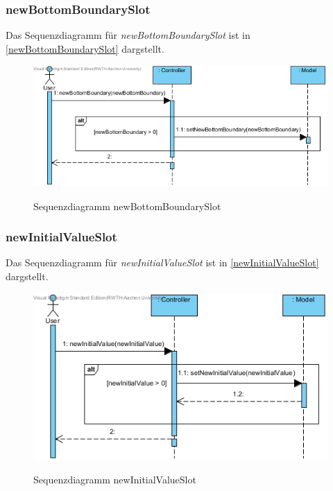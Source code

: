 \subsubsection*{newBottomBoundarySlot}

Das Sequenzdiagramm für \emph{newBottomBoundarySlot} ist in \ref{newBottomBoundarySlot} dargstellt.

\begin{figure}[H]
	\centering
	\includegraphics[scale=.6]{Bilder/Controller__newBottomBoundarySlot().jpg}\\
	\caption{Sequenzdiagramm newBottomBoundarySlot}
	\label{Sequenzdiagramm newBottomBoundarySlot}
\end{figure}

\subsubsection*{newInitialValueSlot}

Das Sequenzdiagramm für \emph{newInitialValueSlot} ist in \ref{newInitialValueSlot} dargstellt.

\begin{figure}[H]
	\centering
	\includegraphics[scale=.6]{Bilder/Controller__newInitialValueSlot().jpg}\\
	\caption{Sequenzdiagramm newInitialValueSlot}
	\label{Sequenzdiagramm newInitialValueSlot}
\end{figure}


